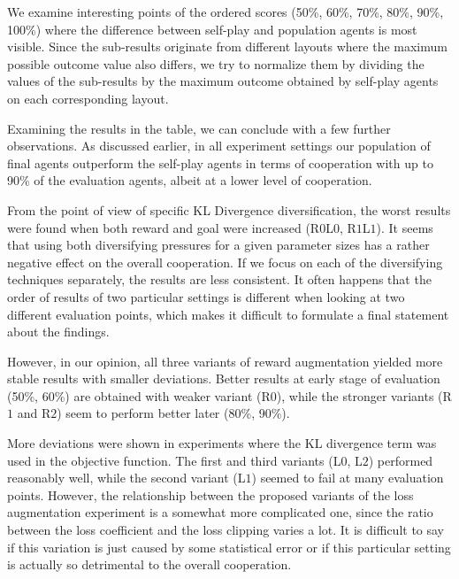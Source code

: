 We examine interesting points of the ordered scores (50\%, 60\%, 70\%, 80\%, 90\%, 100\%) where the difference between self-play and population agents is most visible.
Since the sub-results originate from different layouts where the maximum possible outcome value also differs, we try to normalize them by dividing the values of the sub-results by the maximum outcome obtained by self-play agents on each corresponding layout.

Examining the results in the table, we can conclude with a few further observations.
As discussed earlier, in all experiment settings our population of final agents outperform the self-play agents in terms of cooperation with up to 90\% of the evaluation agents, albeit at a lower level of cooperation.

From the point of view of specific KL Divergence diversification, the worst results were found when both reward and goal were increased (R$0$L$0$, R$1$L$1$).
It seems that using both diversifying pressures for a given parameter sizes has a rather negative effect on the overall cooperation.
If we focus on each of the diversifying techniques separately, the results are less consistent.
It often happens that the order of results of two particular settings is different when looking at two different evaluation points, which makes it difficult to formulate a final statement about the findings.

However, in our opinion, all three variants of reward augmentation yielded more stable results with smaller deviations.
Better results at early stage of evaluation (50\%, 60\%) are obtained with weaker variant (R$0$), while the stronger variants (R$1$ and R$2$) seem to perform better later (80\%, 90\%).


More deviations were shown in experiments where the KL divergence term was used in the objective function.
The first and third variants (L$0$, L$2$) performed reasonably well, while the second variant (L$1$) seemed to fail at many evaluation points.
However, the relationship between the proposed variants of the loss augmentation experiment is a somewhat more complicated one, since the ratio between the loss coefficient and the loss clipping varies a lot. 
It is difficult to say if this variation is just caused by some statistical error or if this particular setting is actually so detrimental to the overall cooperation.

